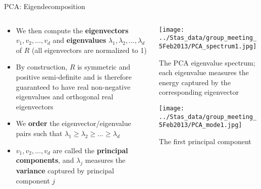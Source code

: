 \begin{frame}{PCA: Eigendecomposition}
\begin{columns}
\begin{column}{0.7\textwidth}
  \begin{itemize}
    \item We then compute the {\bf eigenvectors} $v_1, v_2, \dots, v_d$ and {\bf eigenvalues} $\lambda_1, \lambda_2, \dots, \lambda_d$ of $R$ (all eigenvectors are normalized to 1)
    \item By construction, $R$ is symmetric and positive semi-definite and is therefore guaranteed to have real non-negative eigenvalues and orthogonal real eigenvectors
    \item We {\bf order} the eigenvector/eigenvalue pairs such that $\lambda_1 \ge \lambda_2 \ge \dots \ge \lambda_d$
    \item $v_1, v_2, \dots, v_d$ are called the {\bf principal components}, and $\lambda_j$ measures the {\bf variance} captured by principal component $j$
  \end{itemize}
  \end{column}

  \begin{column}{0.3\textwidth}
        \texttt{[image: ../Stas\_data/group\_meeting\_5Feb2013/PCA\_spectrum1.jpg]}\\
        {\tiny The PCA eigenvalue spectrum; each eigenvalue measures the energy captured by the corresponding eigenvector \par}

        \vspace{0.3 in}

        \texttt{[image: ../Stas\_data/group\_meeting\_5Feb2013/PCA\_mode1.jpg]}\\
        {\tiny The first principal component \par}

  \end{column}
  \end{columns}
\end{frame}

